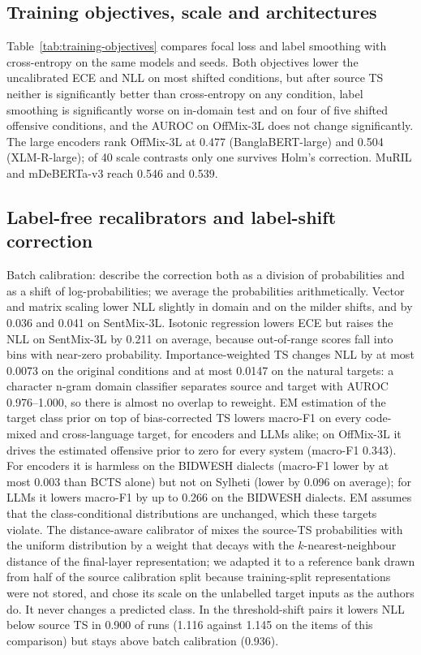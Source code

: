 \subsection{Training objectives, scale and architectures}
\label{sec:appendix-objectives}
Table~\ref{tab:training-objectives} compares focal loss and label smoothing with cross-entropy on the same models and
seeds. Both objectives lower the uncalibrated ECE and NLL on most shifted conditions, but after source TS neither is
significantly better than cross-entropy on any condition, label smoothing is significantly worse on in-domain test and
on four of five shifted offensive conditions, and the AUROC on OffMix-3L does not change significantly. The large
encoders rank OffMix-3L at 0.477 (BanglaBERT-large) and 0.504 (XLM-R-large); of 40 scale contrasts only one survives
Holm's correction. MuRIL and mDeBERTa-v3 reach 0.546 and 0.539.



\subsection{Label-free recalibrators and label-shift correction}
\label{sec:appendix-recalibration}
Batch calibration: \citet{zhou2024batch} describe the correction both as a division of probabilities and as a shift of
log-probabilities; we average the probabilities arithmetically. Vector and matrix scaling lower NLL slightly in domain and on the milder shifts, and by 0.036 and 0.041 on SentMix-3L.
Isotonic regression lowers ECE but raises the NLL on SentMix-3L by 0.211 on average, because out-of-range scores fall
into bins with near-zero probability. Importance-weighted TS changes NLL by at most 0.0073 on the original conditions and at most 0.0147 on the natural targets: a character n-gram domain
classifier separates source and target with AUROC 0.976--1.000, so there is almost no overlap to reweight. EM estimation
of the target class prior \citep{saerens2002adjusting} on top of bias-corrected TS lowers macro-F1 on every code-mixed and
cross-language target, for encoders and LLMs alike; on OffMix-3L it drives the estimated offensive prior to zero for
every system (macro-F1 0.343). For encoders it is harmless on the BIDWESH dialects (macro-F1 lower by at most 0.003 than
BCTS alone) but not on Sylheti (lower by 0.096 on average); for LLMs it lowers macro-F1 by up to 0.266 on the BIDWESH
dialects. EM assumes that the class-conditional distributions are
unchanged, which these targets violate. The distance-aware calibrator of \citet{gasparin2024distance} mixes the
source-TS probabilities with the uniform distribution by a weight that decays with the $k$-nearest-neighbour distance
of the final-layer representation; we adapted it to a reference bank drawn from half of the source calibration split
because training-split representations were not stored, and chose its scale on the unlabelled target inputs as the
authors do. It never changes a predicted class. In the threshold-shift pairs it lowers NLL below source TS in 0.900 of
runs (1.116 against 1.145 on the items of this comparison) but stays above batch calibration (0.936).

